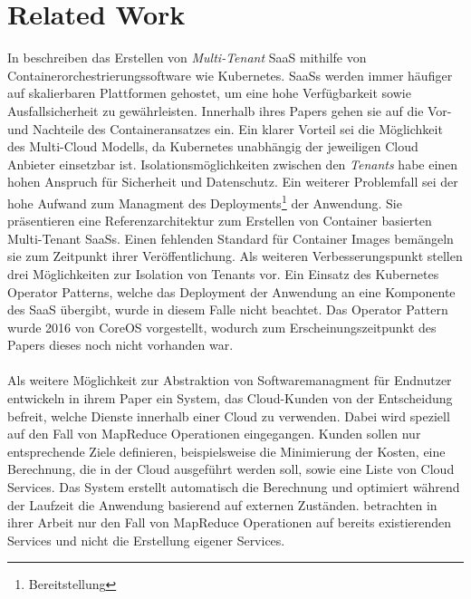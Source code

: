 \section{Related Work}
\label{sec:fazit_ausblick:related_work}

In\cite{Truyen2016} beschreiben \citeauthor{Truyen2016}
das Erstellen von \emph{Multi-Tenant}
\acf{SaaS} mithilfe von Containerorchestrierungssoftware wie Kubernetes.
\acp{SaaS} werden immer häufiger auf skalierbaren Plattformen gehostet, um eine hohe Verfügbarkeit sowie Ausfallsicherheit zu gewährleisten.
Innerhalb ihres Papers gehen sie auf die Vor- und Nachteile des Containeransatzes ein.
Ein klarer Vorteil sei die Möglichkeit des Multi-Cloud Modells, da Kubernetes unabhängig der jeweiligen Cloud Anbieter einsetzbar ist.
Isolationsmöglichkeiten zwischen den \emph{Tenants} habe einen hohen Anspruch für Sicherheit und Datenschutz.
Ein weiterer Problemfall sei der hohe Aufwand zum Managment des Deployments\footnote{Bereitstellung} der Anwendung.
Sie präsentieren eine Referenzarchitektur zum Erstellen von Container basierten Multi-Tenant SaaSs.
Einen fehlenden Standard für Container Images bemängeln sie zum Zeitpunkt ihrer Veröffentlichung.
Als weiteren Verbesserungspunkt stellen \citeauthor{Truyen2016} drei Möglichkeiten zur Isolation von Tenants vor.
Ein Einsatz des Kubernetes Operator Patterns, welche das Deployment der Anwendung an eine Komponente des \acf{SaaS} übergibt,
wurde in diesem Falle nicht beachtet. Das Operator Pattern wurde 2016 von CoreOS vorgestellt, wodurch zum Erscheinungszeitpunkt
des Papers dieses noch nicht vorhanden war.

\paragraph{}
Als weitere Möglichkeit zur Abstraktion von Softwaremanagment für Endnutzer entwickeln \citeauthor{Wieder2012} in ihrem Paper
\cite{Wieder2012} ein System, das Cloud-Kunden von der Entscheidung befreit, welche Dienste innerhalb einer Cloud zu verwenden.
Dabei wird speziell auf den Fall von MapReduce Operationen eingegangen. Kunden sollen nur entsprechende Ziele definieren, beispielsweise
die Minimierung der Kosten, eine Berechnung, die in der Cloud ausgeführt werden soll, sowie eine Liste von Cloud Services.
Das System erstellt automatisch die Berechnung und optimiert während der Laufzeit die Anwendung basierend auf externen Zuständen.
\citeauthor{Wieder2012} betrachten in ihrer Arbeit nur den Fall von MapReduce Operationen auf bereits existierenden Services
und nicht die Erstellung eigener Services.

